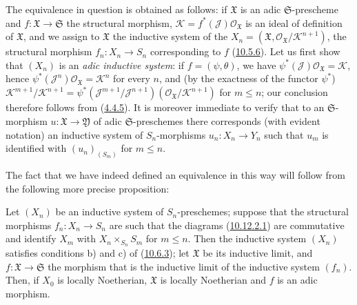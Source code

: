 The equivalence in question is obtained as follows: if
$\mathfrak{X}$ is an adic $\mathfrak{S}$-prescheme and
$f:\mathfrak{X}\to\mathfrak{S}$ the structural morphism,
$\mathscr{K}=f^*(\mathscr{J})\mathscr{O}_{\mathfrak{X}}$ is an ideal of
definition of $\mathfrak{X}$, and we assign to $\mathfrak{X}$ the
inductive system of the
$X_n=(\mathfrak{X},\mathscr{O}_{\mathfrak{X}}/\mathscr{K}^{n+1})$, the
structural morphism $f_n:X_n\to S_n$ corresponding to $f$
(\hyperref[I.10.5.6]{10.5.6}). Let us first show that $(X_n)$ is an
\emph{adic inductive system}: if $f=(\psi,\theta)$, we have
$\psi^*(\mathscr{J})\mathscr{O}_{\mathfrak{X}}=\mathscr{K}$, hence
$\psi^*(\mathscr{J}^n)\mathscr{O}_{\mathfrak{X}}=\mathscr{K}^n$ for every
$n$, and (by the exactness of the functor $\psi^*$)
$\mathscr{K}^{m+1}/\mathscr{K}^{n+1}
=\psi^*(\mathscr{J}^{m+1}/\mathscr{J}^{n+1})
(\mathscr{O}_{\mathfrak{X}}/\mathscr{K}^{n+1})$ for $m\leq n$; our
conclusion therefore follows from (\hyperref[I.4.4.5]{4.4.5}). It is
moreover immediate to verify that to an $\mathfrak{S}$-morphism
$u:\mathfrak{X}\to\mathfrak{Y}$ of adic $\mathfrak{S}$-preschemes
there corresponds (with evident notation)
an inductive system of $S_n$-morphisms $u_n:X_n\to Y_n$ such that $u_m$
is identified with $(u_n)_{(S_m)}$ for $m\leq n$.

The fact that we have indeed defined an equivalence in this way will
follow from the following more precise proposition:

\begin{proposition}[10.12.3.1]
\label{I.10.12.3.1}
Let $(X_n)$ be an inductive system of $S_n$-preschemes; suppose that the
structural morphisms $f_n:X_n\to S_n$ are such that the diagrams
\textup{(\hyperref[I.10.12.2.1]{10.12.2.1})} are commutative and identify
$X_m$ with $X_n\times_{S_n}S_m$ for $m\leq n$. Then the inductive system
$(X_n)$ satisfies conditions \textup{b)} and \textup{c)} of
\textup{(\hyperref[I.10.6.3]{10.6.3})}; let $\mathfrak{X}$ be its inductive limit,
and $f:\mathfrak{X}\to\mathfrak{S}$ the morphism that is the inductive limit
of the inductive system $(f_n)$. Then, if $X_0$ is locally Noetherian,
$\mathfrak{X}$ is locally Noetherian and $f$ is an adic morphism.
\end{proposition}

